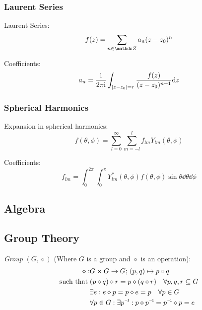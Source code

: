 		\subsubsection{Laurent Series}
			\noindent
			Laurent Series:
			\begin{equation}
				f(z)=\sum_{n\in\integers} a_n(z-z_0)^n
			\end{equation}

			\noindent
			Coefficients:
			\begin{equation}
				a_n = \frac{1}{2 \pi \mathrm{i}}\int_{\abs{ z-z_0 } = r} \frac{f(z)}{(z-z_0)^{n+1}}\dd z
			\end{equation}

		\subsubsection{Spherical Harmonics}
			\noindent
			Expansion in spherical harmonics:
			\begin{equation}
				f(\theta, \phi) = \sum_{l=0}^{\infty} \sum_{m=-l}^{l} f_{lm} Y_{lm}(\theta,\phi)
			\end{equation}

			\noindent
			Coefficients:
			\begin{equation}
				f_{lm} = \int_0^{2\pi} \int_0^\pi Y_{lm}^{*}(\theta,\phi) f(\theta,\phi) \sin\theta\dd{\theta}\dd{\phi}
			\end{equation}

	\subsection{Algebra}
	\subsection{Group Theory}
		\emph{Group} $(G, \diamond)$ (Where $G$ is a group and $\diamond$ is an operation):
		\begin{equation}
			\begin{aligned}
				\diamond: &G \times G \to G;\, (p,q) \mapsto p\diamond q \\
				\text{such that}\; &(p\diamond q)\diamond r = p\diamond (q\diamond r)\quad\forall{p,q,r}\subseteq G \\
				&\exists e: e\diamond p = p\diamond e = p\quad\forall p\in G\\
				&\forall p \in G: \exists \inv{p}: p\diamond \inv{p}= \inv{p}\diamond p=e
			\end{aligned}
		\end{equation}

